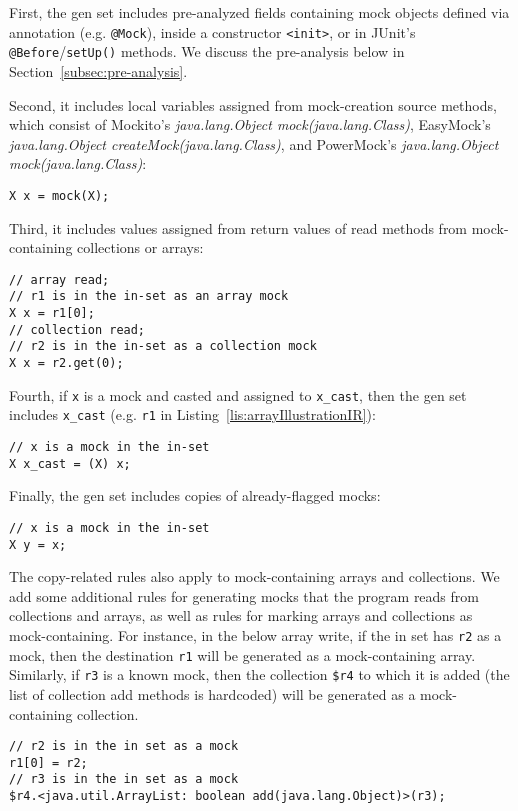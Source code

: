 First, the gen set includes pre-analyzed fields containing mock objects defined via annotation (e.g. \texttt{@Mock}), inside a constructor \texttt{<init>}, or in JUnit's \texttt{@Before}/\texttt{setUp()} methods. We discuss the pre-analysis below in Section~\ref{subsec:pre-analysis}. 

Second, it includes local variables assigned from mock-creation source methods, which consist of Mockito's \textit{java.lang.Object mock(java.lang.Class)}, EasyMock's \textit{java.lang.Object createMock(java.lang.Class)}, and PowerMock's \textit{java.lang.Object mock(java.lang.Class)}:
\begin{lstlisting}[basicstyle=\ttfamily\small,numbers=none]
X x = mock(X);
\end{lstlisting}

Third, it includes values assigned from return values of read methods from mock-containing collections or arrays:
\begin{lstlisting}[basicstyle=\ttfamily\small,numbers=none]
// array read;
// r1 is in the in-set as an array mock
X x = r1[0];
// collection read;
// r2 is in the in-set as a collection mock
X x = r2.get(0);
\end{lstlisting}

Fourth, if \texttt{x} is a mock and casted and assigned to \texttt{x\_cast}, then the gen set includes \texttt{x\_cast} (e.g. \texttt{r1} in Listing~\ref{lis:arrayIllustrationIR}):
\begin{lstlisting}[basicstyle=\ttfamily\small,numbers=none]
// x is a mock in the in-set
X x_cast = (X) x;
\end{lstlisting}

Finally, the gen set includes copies of already-flagged mocks:
\begin{lstlisting}[basicstyle=\ttfamily\small,numbers=none]
// x is a mock in the in-set
X y = x;
\end{lstlisting}
The copy-related rules also apply to mock-containing arrays and collections. We add some additional rules for generating mocks that the program reads from collections and arrays, as well as rules for marking arrays and collections as mock-containing. For instance, in the below array write, if the in set has \texttt{r2} as a mock, then the destination \texttt{r1} will be generated as a mock-containing array. Similarly, if \texttt{r3} is a known mock, then the collection \texttt{\$r4} to which it is added (the list of collection add methods is hardcoded) will be generated as a mock-containing collection.
\begin{lstlisting}[basicstyle=\ttfamily\small,numbers=none]
// r2 is in the in set as a mock
r1[0] = r2;
// r3 is in the in set as a mock
$r4.<java.util.ArrayList: boolean add(java.lang.Object)>(r3);
\end{lstlisting}

